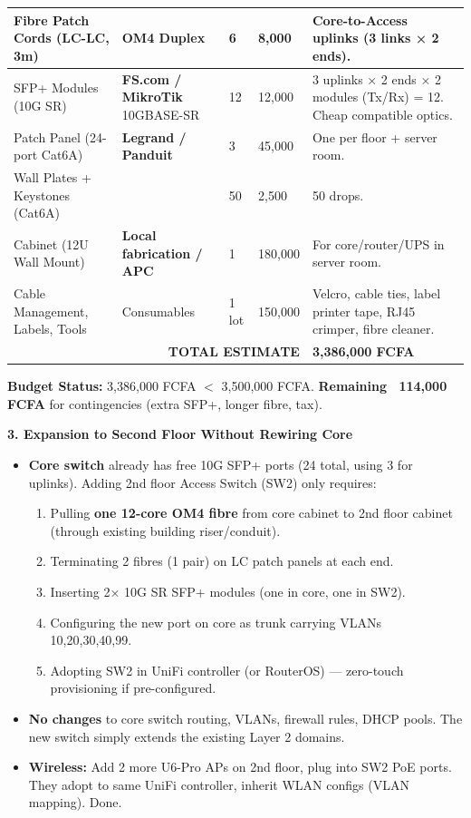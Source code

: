 \documentclass[11pt]{article}
\begin{document}
\begin{exoresolu}
\begin{center}
\begin{tabularx}{\linewidth}{|l|X|l|l|X|}
Fibre Patch Cords (LC-LC, 3m) & OM4 Duplex & 6 & 8,000 & Core-to-Access uplinks (3 links × 2 ends). \\ \hline
SFP+ Modules (10G SR) & \textbf{FS.com / MikroTik} 10GBASE-SR & 12 & 12,000 & 3 uplinks × 2 ends × 2 modules (Tx/Rx) = 12. Cheap compatible optics. \\ \hline
Patch Panel (24-port Cat6A) & \textbf{Legrand / Panduit} & 3 & 45,000 & One per floor + server room. \\ \hline
Wall Plates + Keystones (Cat6A) & & 50 & 2,500 & 50 drops. \\ \hline
Cabinet (12U Wall Mount) & \textbf{Local fabrication / APC} & 1 & 180,000 & For core/router/UPS in server room. \\ \hline
Cable Management, Labels, Tools & Consumables & 1 lot & 150,000 & Velcro, cable ties, label printer tape, RJ45 crimper, fibre cleaner. \\ \hline
\multicolumn{4}{|r|}{\textbf{TOTAL ESTIMATE}} & \textbf{3,386,000 FCFA} \\ \hline
\end{tabularx}
\end{center}

\textbf{Budget Status:} 3,386,000 FCFA $<$ 3,500,000 FCFA. \textbf{Remaining ~114,000 FCFA} for contingencies (extra SFP+, longer fibre, tax).

\textbf{3. Expansion to Second Floor Without Rewiring Core}
\begin{itemize}
\item \textbf{Core switch} already has free 10G SFP+ ports (24 total, using 3 for uplinks). Adding 2nd floor Access Switch (SW2) only requires:
      \begin{enumerate}
      \item Pulling \textbf{one 12-core OM4 fibre} from core cabinet to 2nd floor cabinet (through existing building riser/conduit).
      \item Terminating 2 fibres (1 pair) on LC patch panels at each end.
      \item Inserting 2× 10G SR SFP+ modules (one in core, one in SW2).
      \item Configuring the new port on core as trunk carrying VLANs 10,20,30,40,99.
      \item Adopting SW2 in UniFi controller (or RouterOS) — zero-touch provisioning if pre-configured.
      \end{enumerate}
\item \textbf{No changes} to core switch routing, VLANs, firewall rules, DHCP pools. The new switch simply extends the existing Layer 2 domains.
\item \textbf{Wireless:} Add 2 more U6-Pro APs on 2nd floor, plug into SW2 PoE ports. They adopt to same UniFi controller, inherit WLAN configs (VLAN mapping). Done.
\end{itemize}


\end{exoresolu}
\end{document}
